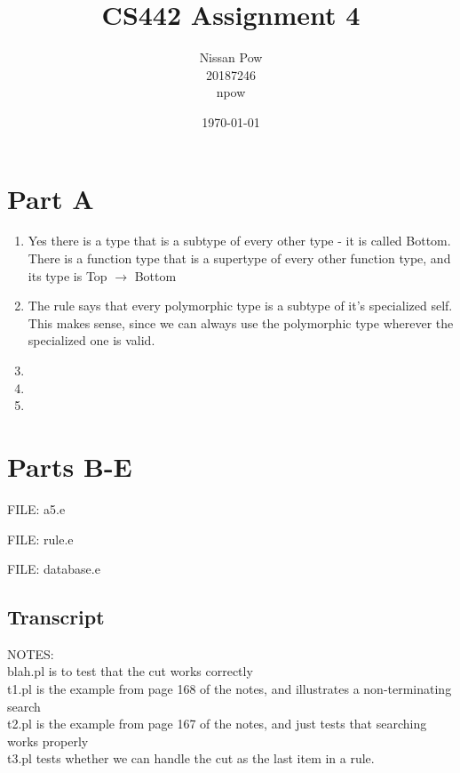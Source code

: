 \documentclass[onecolumn,11pt]{article}
\title{CS442 Assignment 4}
\author{Nissan Pow\\20187246\\npow}
\date{\today}
\begin{document}
\maketitle

\section*{Part A}
\begin{enumerate}
  \item{Yes there is a type that is a subtype of every other type - it is called Bottom. There is a function type that is a supertype of every other function type, and its type is Top $\to$ Bottom}
  \item{The rule says that every polymorphic type is a subtype of it's specialized self. This makes sense, since we can always use the polymorphic type wherever the specialized one is valid.}
  \item{}
  \item{}
  \item{}
\end{enumerate}

\section*{Parts B-E}
FILE: a5.e

FILE: rule.e

FILE: database.e

\clearpage

\subsection*{Transcript}

NOTES: \\
blah.pl is to test that the cut works correctly \\
t1.pl is the example from page 168 of the notes, and illustrates a non-terminating search \\
t2.pl is the example from page 167 of the notes, and just tests that searching works properly \\
t3.pl tests whether we can handle the cut as the last item in a rule. \\
\end{document}
